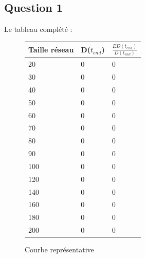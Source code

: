 \documentclass[10pt]{report}
\begin{document}
\subsection{Question 1}

Le tableau complété :
\begin{figure}[h]
\begin{minipage}[b]{0.4\textwidth} \begin{flushleft}
\begin{center}
\begin{tabular}{|l|l|l|} \hline
  Taille réseau & D($t_{end}$) & $\frac{ED(t_{end})}{D(t_{end})}$\\ \hline
	20 & 0 & 0\\ \hline
  	30 & 0 & 0\\ \hline
  	40 & 0 & 0\\ \hline
  	50 & 0 & 0\\ \hline
  	60 & 0 & 0\\ \hline
  	70 & 0 & 0\\ \hline
    80 & 0 & 0\\ \hline
  	90 & 0 & 0\\ \hline
  	100 & 0 & 0\\ \hline
  	120 & 0 & 0\\ \hline
  	140 & 0 & 0\\ \hline
  	160 & 0 & 0\\ \hline
  	180 & 0 & 0\\ \hline
  	200 & 0 & 0\\ \hline
\end{tabular}
\end{center}
\end{flushleft}\end{minipage}
%
\begin{minipage}{0.6\textwidth} \begin{flushright}
\vspace{1.5cm}
\begin{center}
	\caption[courbe1]{Courbe représentative}
\end{center}
\end{flushright}\end{minipage}
\end{figure}
\end{document}
